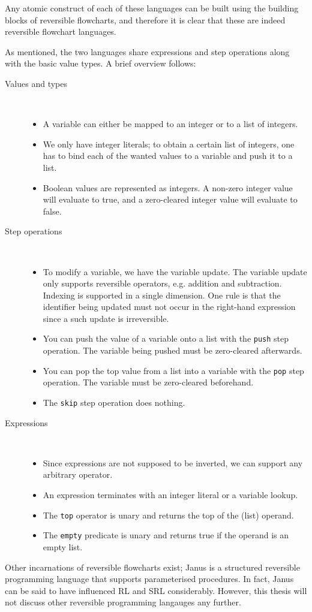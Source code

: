 Any atomic construct of each of these languages can be built using the building blocks of reversible flowcharts, and therefore it is clear that these are indeed reversible flowchart languages.

As mentioned, the two languages share expressions and step operations along with the basic value types. A brief overview follows:
\begin{description}
  \item[Values and types]~\
  \begin{itemize}
    \item A variable can either be mapped to an integer or to a list of integers.
    \item We only have integer literals; to obtain a certain list of integers, one has to bind each of the wanted values to a variable and push it to a list.
    \item Boolean values are represented as integers. A non-zero integer value will evaluate to true, and a zero-cleared integer value will evaluate to false.
  \end{itemize}
  \item [Step operations]~\
  \begin{itemize}
    \item To modify a variable, we have the variable update. The variable update only supports reversible operators, e.g. addition and subtraction. Indexing is supported in a single dimension. One rule is that the identifier being updated must not occur in the right-hand expression since a such update is irreversible.
    \item You can push the value of a variable onto a list with the \texttt{push} step operation. The variable being pushed must be zero-cleared afterwards.
    \item You can pop the top value from a list into a variable with the \texttt{pop} step operation. The variable must be zero-cleared beforehand.
    \item The \texttt{skip} step operation does nothing.
  \end{itemize}
  \item [Expressions]~\
  \begin{itemize}
    \item Since expressions are not supposed to be inverted, we can support any arbitrary operator.
    \item An expression terminates with an integer literal or a variable lookup.
    \item The \texttt{top} operator is unary and returns the top of the (list) operand.
    \item The \texttt{empty} predicate is unary and returns true if the operand is an empty list.
  \end{itemize}
\end{description}
Other incarnations of reversible flowcharts exist; Janus \cite{JAN} is a structured reversible programming language that supports parameterised procedures. In fact, Janus can be said to have influenced RL and SRL considerably. However, this thesis will not discuss other reversible programming langauges any further.

